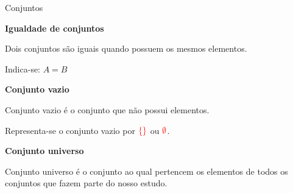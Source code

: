 \documentclass[11pt, openright, a4paper, brazil, english, french, spanish, bibjustif, xcolor=table,aspectratio=169]{beamer}
\begin{document}
\begin{frame}[t]{Conjuntos}
\medskip

\textbf{Igualdade de conjuntos}

\medskip

\begin{minipage}{\columnwidth}

Dois conjuntos são iguais quando possuem os mesmos elementos.

Indica-se: $A=B$

\end{minipage}

\medskip

\pause

\textbf{Conjunto vazio}

\medskip

\begin{minipage}{\columnwidth}

Conjunto vazio é o conjunto que não possui elementos.

Representa-se o conjunto vazio por $\textcolor{red}{\{\}}$ ou $\textcolor{red}{\emptyset}$.

\end{minipage}

\pause

\medskip

\textbf{Conjunto universo}

\medskip

\begin{minipage}{\columnwidth}

Conjunto universo é o conjunto ao qual pertencem os elementos de todos os conjuntos que fazem parte do nosso estudo.

\end{minipage}

\end{frame}
\end{document}
